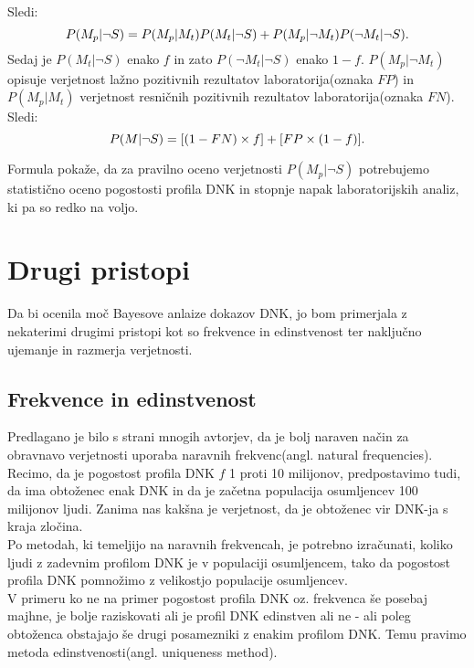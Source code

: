 \documentclass[12pt,a4paper]{amsart}
\theoremstyle{definition} %
\theoremstyle{plain} %
\begin{document}
Sledi:
\[P(M_p \lvert \neg S) = P(M_p \lvert M_t)P(M_t \lvert \neg S) + P(M_p \lvert \neg M_t)P(\neg M_t \lvert \neg S). \vspace{3mm}\]
Sedaj je $P(M_t \lvert \neg S)$ enako $f$ in zato $P(\neg M_t \lvert \neg S)$ enako $1-f$. $P(M_p \lvert \neg M_t)$ opisuje verjetnost lažno
pozitivnih rezultatov laboratorija(oznaka $FP$) in $P(M_p \lvert M_t)$ verjetnost resničnih pozitivnih rezultatov laboratorija(oznaka $FN$).
Sledi: \vspace{2mm}
\[P(M \lvert \neg S) = [(1 - FN) \times f] + [FP \times (1 - f)]. \vspace{3mm}\]
 
Formula pokaže, da za pravilno oceno verjetnosti $P(M_p \lvert \neg S)$ potrebujemo statistično oceno pogostosti profila DNK in stopnje napak
laboratorijskih analiz, ki pa so redko na voljo. \vspace{3mm}
 
\section{Drugi pristopi}
Da bi ocenila moč Bayesove anlaize dokazov DNK, jo bom primerjala z nekaterimi drugimi pristopi kot so frekvence in edinstvenost ter naključno 
ujemanje in razmerja verjetnosti.

\subsection{Frekvence in edinstvenost}
Predlagano je bilo s strani mnogih avtorjev, da je bolj naraven način za obravnavo verjetnosti uporaba naravnih frekvenc(angl. natural
frequencies). Recimo, da je pogostost profila DNK $f$ 1 proti 10 milijonov, predpostavimo tudi, da ima obtoženec enak DNK in da je začetna
populacija osumljencev 100 milijonov ljudi. Zanima nas kakšna je verjetnost, da je obtoženec vir DNK-ja s kraja zločina. \\
 
Po metodah, ki temeljijo na naravnih frekvencah, je potrebno izračunati, koliko ljudi z zadevnim profilom DNK je v populaciji osumljencem, tako
da pogostost profila DNK pomnožimo z velikostjo populacije osumljencev.  \\
V primeru ko ne na primer pogostost profila DNK oz. frekvenca še posebaj majhne, je bolje raziskovati ali je profil DNK edinstven ali ne - ali 
poleg obtoženca obstajajo še drugi posamezniki z enakim profilom DNK. Temu pravimo metoda edinstvenosti(angl. uniqueness method). \\
 
\end{document}
